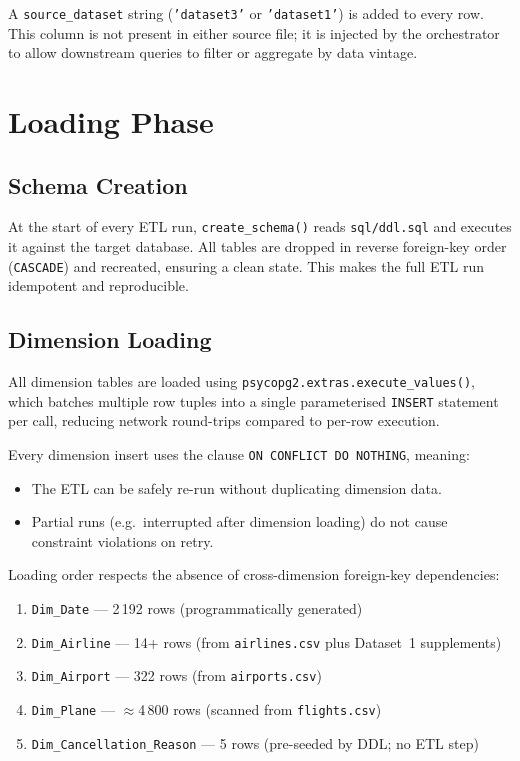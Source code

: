 \documentclass[12pt,a4paper]{article}
\begin{document}
A \texttt{source\_dataset} string (\texttt{'dataset3'} or
\texttt{'dataset1'}) is added to every row. This column is not present in
either source file; it is injected by the orchestrator to allow downstream
queries to filter or aggregate by data vintage.

\section{Loading Phase}

\subsection{Schema Creation}

At the start of every ETL run, \texttt{create\_schema()} reads
\texttt{sql/ddl.sql} and executes it against the target database. All tables
are dropped in reverse foreign-key order (\texttt{CASCADE}) and recreated,
ensuring a clean state. This makes the full ETL run idempotent and
reproducible.

\subsection{Dimension Loading}

All dimension tables are loaded using
\texttt{psycopg2.extras.execute\_values()}, which batches multiple row tuples
into a single parameterised \texttt{INSERT} statement per call, reducing
network round-trips compared to per-row execution.

Every dimension insert uses the clause \texttt{ON CONFLICT DO NOTHING},
meaning:

\begin{itemize}
    \item The ETL can be safely re-run without duplicating dimension data.
    \item Partial runs (e.g.\ interrupted after dimension loading) do not
          cause constraint violations on retry.
\end{itemize}

Loading order respects the absence of cross-dimension foreign-key
dependencies:

\begin{enumerate}
    \item \texttt{Dim\_Date} — 2\,192 rows (programmatically generated)
    \item \texttt{Dim\_Airline} — 14+ rows (from \texttt{airlines.csv} plus Dataset~1 supplements)
    \item \texttt{Dim\_Airport} — 322 rows (from \texttt{airports.csv})
    \item \texttt{Dim\_Plane} — $\approx$4\,800 rows (scanned from \texttt{flights.csv})
    \item \texttt{Dim\_Cancellation\_Reason} — 5 rows (pre-seeded by DDL; no ETL step)
\end{enumerate}
\end{document}
